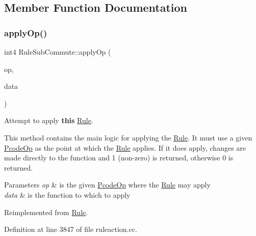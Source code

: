 \subsection{Member Function Documentation}
\mbox{\label{class_rule_sub_commute_a346f3bfeee9d7233be7a17387ebc553f}} 
\subsubsection{\texorpdfstring{applyOp()}{applyOp()}}
{\footnotesize\ttfamily int4 Rule\+Sub\+Commute\+::apply\+Op (\begin{DoxyParamCaption}\item[{\mbox{\hyperlink{class_pcode_op}{Pcode\+Op}} $\ast$}]{op,  }\item[{\mbox{\hyperlink{class_funcdata}{Funcdata}} \&}]{data }\end{DoxyParamCaption})\hspace{0.3cm}{\ttfamily [virtual]}}



Attempt to apply {\bfseries{this}} \mbox{\hyperlink{class_rule}{Rule}}. 

This method contains the main logic for applying the \mbox{\hyperlink{class_rule}{Rule}}. It must use a given \mbox{\hyperlink{class_pcode_op}{Pcode\+Op}} as the point at which the \mbox{\hyperlink{class_rule}{Rule}} applies. If it does apply, changes are made directly to the function and 1 (non-\/zero) is returned, otherwise 0 is returned. 
\begin{DoxyParams}{Parameters}
{\em op} & is the given \mbox{\hyperlink{class_pcode_op}{Pcode\+Op}} where the \mbox{\hyperlink{class_rule}{Rule}} may apply \\
\hline
{\em data} & is the function to which to apply \\
\hline
\end{DoxyParams}


Reimplemented from \mbox{\hyperlink{class_rule_a4e3e61f066670175009f60fb9dc60848}{Rule}}.



Definition at line 3847 of file ruleaction.\+cc.

